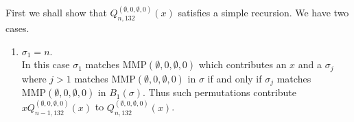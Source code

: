 \documentclass[
final,nomarks
]{dmtcs-episciences}
\newcommand{\Qmmn}[2]{Q_{#2,132}^{(#1)}(x)}
\newcommand{\MMP}{\mathrm{MMP}}
\begin{document}
First we shall show that \begin{math}\Qmmn{\emptyset,0,\emptyset,0}{n}\end{math} satisfies a simple recursion. 
We have two cases. 
\begin{enumerate}[{\bf Case }\bf 1.]
	\item \begin{math}\sigma_1 =n\end{math}.  \\
	In this case \begin{math}\sigma_1\end{math} matches \begin{math}\MMP(\emptyset,0,\emptyset,0)\end{math} which 
	contributes an \begin{math}x\end{math} and a \begin{math}\sigma_j\end{math} where \begin{math}j > 1\end{math} matches \begin{math}\MMP(\emptyset,0,\emptyset,0)\end{math} 
	in \begin{math}\sigma\end{math} if and only if \begin{math}\sigma_j\end{math}  matches \begin{math}\MMP(\emptyset,0,\emptyset,0)\end{math} 
	in \begin{math}B_1(\sigma)\end{math}. Thus such permutations contribute \begin{math}x\Qmmn{\emptyset,0,\emptyset,0}{n-1}\end{math} to 
	\begin{math}\Qmmn{\emptyset,0,\emptyset,0}{n}\end{math}.
	

\end{enumerate}
\end{document}
